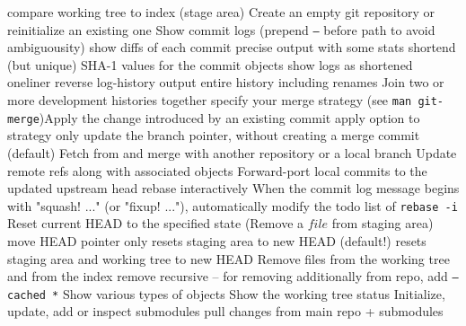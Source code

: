 	{compare working tree to index (stage area)}
	{Create an empty git repository or reinitialize an existing one}
	{Show commit logs (prepend {\tt --} before path to avoid ambiguousity)}
	{show diffs of each commit}
	{precise output with some stats}
	{shortend (but unique) SHA-1 values for the commit objects }
	{show logs as shortened oneliner}
	{reverse log-history output}
	{entire history including renames}
	{Join two or more development histories together}
	{specify your merge strategy (see {\tt man git-merge})}Apply the change introduced by an existing commit
	{apply option to strategy}
	{only update the branch pointer, without creating a merge commit (default)}
	{Fetch from and merge with another re\-pository or a local branch}
	{Update remote refs along with associated objects}
	{Forward-port local commits to the updated upstream head}
	{rebase interactively}
	{When the commit log message begins with "squash! ..." (or "fixup! ..."), automatically modify the todo list of {\tt rebase -i} }
	{Reset current HEAD to the specified state (Remove a $file$ from staging area)}
	{move HEAD pointer only}
	{resets staging area to new HEAD (default!)}
	{resets staging area and working tree to new HEAD}
	{Remove files from the working tree and from the index}
	{remove recursive -- for removing additionally from repo, add
{\tt --cached *}}
	{Show various types of objects}
	{Show the working tree status}
	{Initialize, update, add or inspect submodules}
	{pull changes from main repo + submodules}

